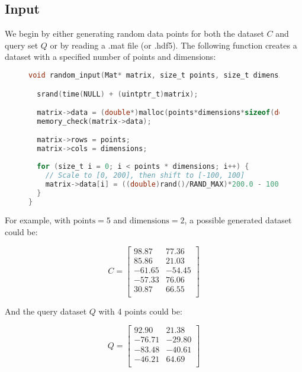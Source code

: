 \documentclass{article}
\begin{document}
\subsection{Input}
We begin by either generating random data points for both the dataset \( C \) and query set \( Q \) or by reading a .mat file (or .hdf5). The following function creates a dataset with a specified number of points and dimensions:

\begin{figure}[H]
\begin{lstlisting}[language=C, caption={Generating random data points}]
void random_input(Mat* matrix, size_t points, size_t dimensions) {

  srand(time(NULL) + (uintptr_t)matrix);

  matrix->data = (double*)malloc(points*dimensions*sizeof(double));
  memory_check(matrix->data);

  matrix->rows = points;
  matrix->cols = dimensions;
   
  for (size_t i = 0; i < points * dimensions; i++) {
    // Scale to [0, 200], then shift to [-100, 100]
    matrix->data[i] = ((double)rand()/RAND_MAX)*200.0 - 100.0;
  }
}
\end{lstlisting}
\end{figure}

For example, with \( \text{points} = 5 \) and \( \text{dimensions} = 2 \), a possible generated dataset could be:

\[
C = \begin{bmatrix}
98.87 & 77.36 \\
85.86 & 21.03 \\
-61.65 & -54.45 \\
-57.33 & 76.06 \\
30.87 & 66.55 \\
\end{bmatrix}
\]

And the query dataset \( Q \) with 4 points could be:

\[
Q = \begin{bmatrix}
92.90 & 21.38 \\
-76.71 & -29.80 \\
-83.48 & -40.61 \\
-46.21 & 64.69 \\
\end{bmatrix}
\]
\end{document}
